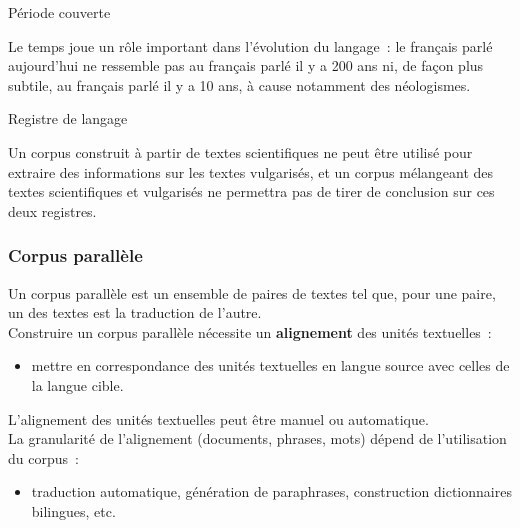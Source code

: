 \begin{frame}[allowframebreaks]
\framebreak

\begin{block}{Période couverte}

Le temps joue un rôle important dans l'évolution du langage~: le français parlé 
aujourd'hui ne ressemble pas au français parlé il y a 200 ans ni, de façon plus 
subtile, au français parlé il y a 10 ans, à cause notamment des néologismes.

\end{block}


\begin{block}{Registre de langage}

Un corpus construit à partir de textes scientifiques ne peut être utilisé pour 
extraire des informations sur les textes vulgarisés, et un corpus mélangeant des
textes scientifiques et vulgarisés ne permettra pas de tirer de conclusion sur 
ces deux registres.

\end{block}

\end{frame}

\begin{frame}
\frametitle{Corpus parallèle}

Un corpus parallèle est un ensemble de paires de textes tel que, pour une 
paire, un des textes est la traduction de l'autre. \\[0.5em]

Construire un corpus parallèle nécessite un \textbf{alignement} des unités 
textuelles~:

    \begin{itemize}
        \item mettre en correspondance des unités textuelles en langue source
              avec celles de la langue cible.
    \end{itemize}

L'alignement des unités textuelles peut être manuel ou automatique.\\[0.5em]

La granularité de l'alignement (documents, phrases, mots) dépend de 
l'utilisation du corpus~:

    \begin{itemize}
        \item traduction automatique, génération de paraphrases, construction
              dictionnaires bilingues, etc.
    \end{itemize}

\end{frame}

